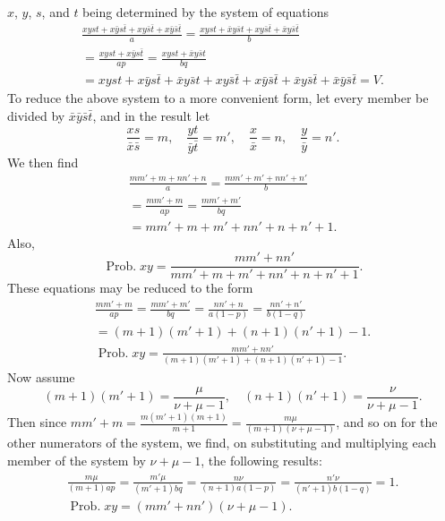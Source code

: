 \documentclass[oneside]{book}
\begin{document}
$x$, $y$, $s$, and $t$ being determined by the system of equations
\begin{gather*}
\frac{xyst + x\bar{y}s\bar{t} + xy\bar{s}\bar{t} + x\bar{y}\bar{s}\bar{t}}{a}
= \frac{xyst + \bar{x}y\bar{s}t + xy\bar{s}\bar{t} + \bar{x}y\bar{s}\bar{t}}{b} \\
= \frac{xyst + x\bar{y}s\bar{t}}{ap}=\frac{xyst + \bar{x}y\bar{s}t}{bq} \\
= xyst + x\bar{y}s\bar{t} + \bar{x}y\bar{s}t + xy\bar{s}\bar{t} + x\bar{y}\bar{s}\bar{t}
+\bar{x}y\bar{s}\bar{t}+\bar{x}\bar{y}\bar{s}\bar{t}=V.
\end{gather*}
To reduce the above system to a more convenient form, let every
member be divided by $\bar{x}\bar{y}\bar{s}\bar{t}$, and in the result let
\begin{equation*}
\frac{xs}{\bar{x}\bar{s}}=m, \quad
\frac{yt}{\bar{y}\bar{t}}=m',\quad
\frac{x}{\bar{x}}=n, \quad
\frac{y}{\bar{y}}=n'.
\end{equation*}
We then find
\begin{gather*}
\frac{m m' + m + nn' + n}{a}=\frac{mm' + m' + nn' + n'}{b} \\
=\frac{mm'+m}{ap} = \frac{mm'+m'}{bq} \\
= mm' + m + m' + nn' + n + n' + 1.
\end{gather*}
Also,
\begin{equation*}
\operatorname{Prob. } xy = \frac{mm' + nn'}{mm'+m+m'+nn'+n+n'+1}.
\end{equation*}
These equations may be reduced to the form
\begin{gather*}
 \frac{mm'+m}{ap}    =\frac{mm'+m'}{bq}
=\frac{nn'+n}{a(1-p)}=\frac{nn'+n'}{b(1-q)} \\
=(m+1)(m'+1) + (n+1)(n'+1) - 1. \\
\operatorname{Prob. } xy = \frac{mm' + nn'}{(m+1)(m'+1)+(n+1)(n'+1)-1}.
\end{gather*}
Now assume
\begin{equation*}\tag{2}
(m+1)(m'+1)=\frac{\mu}{\nu + \mu - 1}, \quad (n+1)(n'+1)=\frac{\nu}{\nu + \mu - 1}.
\end{equation*}
Then since $\displaystyle mm'+m=\frac{m(m'+1)(m+1)}{m+1}=\frac{m\mu}{(m+1)(\nu + \mu - 1)}$,
and so on for the other numerators of the system, we find, on
substituting and multiplying each member of the system by
$\nu + \mu - 1$, the following results:
\begin{gather*}
 \frac{m \mu}{(m +1)ap}
=\frac{m'\mu}{(m'+1)bq}
=\frac{n \nu}{(n +1)a(1-p)}
=\frac{n'\nu}{(n'+1)b(1-q)} = 1.
\\
\operatorname{Prob. } xy = (mm' + nn')(\nu + \mu - 1). \tag{3}
\end{gather*}
\end{document}
